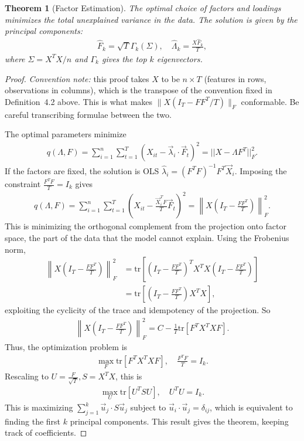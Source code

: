 \documentclass[11pt]{article}
\theoremstyle{definition}
\theoremstyle{plain}
\newtheorem{theorem}{Theorem}[section]
\theoremstyle{remark}
\begin{document}
\begin{theorem}[Factor Estimation]
    The optimal choice of factors and loadings minimizes the total unexplained variance in the data. The solution is given by the principal components:
    \begin{align}
        \hat{F}_k = \sqrt{T}\Gamma_k(\Sigma), \quad \hat{\Lambda}_k = \frac{X\hat{F}_k }{T},
    \end{align}
    where $\Sigma = X^TX/n$ and $\Gamma_k$ gives the top $k$ eigenvectors.
\end{theorem}
\begin{proof}
    \emph{Convention note:} this proof takes $X$ to be $n \times T$ (features in rows, observations in columns), which is the transpose of the convention fixed in Definition~4.2 above. This is what makes $\|X(I_T - FF^T/T)\|_F$ conformable. Be careful transcribing formulae between the two.

    The optimal parameters minimize
    \begin{align}
       q(\Lambda, F) = \sum_{i=1}^n \sum_{t=1}^T (X_{it} - \vec{\lambda}_i \cdot \vec{F}_t)^2 = ||X - \Lambda F^T||_F^2.
    \end{align}
    If the factors are fixed, the solution is OLS $\hat{\lambda}_i =(F^TF)^{-1}F^T\vec{X}_i$. Imposing the constraint $\frac{F^TF}{T}=I_k$ gives
    \begin{align}
       q(\Lambda, F) =  \sum_{i=1}^n \sum_{t=1}^T \left(X_{it} - \frac{\vec{X}_i^TF}{T}\vec{F}_t\right)^2 = \left\|X \left(I_T- \frac{FF^T}{T}\right)\right\|_F^2.
    \end{align}
    This is minimizing the orthogonal complement from the projection onto factor space, the part of the data that the model cannot explain. Using the Frobenius norm,
    \begin{align}
        \left\|X \left(I_T- \frac{FF^T}{T}\right)\right\|_F^2 &= \text{tr}\left[\left(I_T- \frac{FF^T}{T}\right)^T X^TX \left(I_T- \frac{FF^T}{T}\right)\right]\\
        &= \text{tr}\left[\left(I_T- \frac{FF^T}{T}\right) X^TX\right],
    \end{align}
    exploiting the cyclicity of the trace and idempotency of the projection. So
    \begin{align}
        \left\|X \left(I_T- \frac{FF^T}{T}\right)\right\|_F^2 = C - \frac{1}{T}\text{tr}[F^T X^TXF].
    \end{align}
    Thus, the optimization problem is
    \begin{align}
        \max_F \text{tr}[F^T X^TXF], \quad\frac{F^TF}{T}=I_k.
    \end{align}
    Rescaling to $U = \frac{F}{\sqrt{T}}, S = X^TX$, this is
    \begin{align}
        \max_U \text{tr}[U^TSU], \quad U^TU=I_k.
    \end{align}
    This is maximizing $\sum_{j=1}^k \vec{u}_j \cdot S\vec{u}_j$ subject to $\vec{u}_i \cdot \vec{u}_j = \delta_{ij}$, which is equivalent to finding the first $k$ principal components. This result gives the theorem, keeping track of coefficients.
\end{proof}
\end{document}

